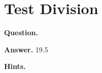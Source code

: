 \documentclass{article}
\begin{document}
\section*{Test Division}
\textbf{Question.} 

\textbf{Answer.} 19.5

\textbf{Hints.}
\begin{itemize}

\end{itemize}
\end{document}
